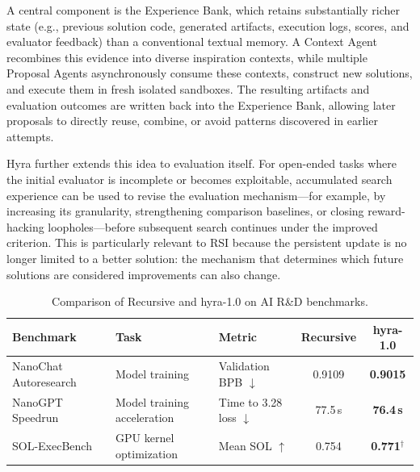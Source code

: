 A central component is the Experience Bank, which retains substantially richer state (e.g., previous solution code, generated artifacts, execution logs, scores, and evaluator feedback) than a conventional textual memory. A Context Agent recombines this evidence into diverse inspiration contexts, while multiple Proposal Agents asynchronously consume these contexts, construct new solutions, and execute them in fresh isolated sandboxes. The resulting artifacts and evaluation outcomes are written back into the Experience Bank, allowing later proposals to directly reuse, combine, or avoid patterns discovered in earlier attempts.

Hyra further extends this idea to evaluation itself. For open-ended tasks where the initial evaluator is incomplete or becomes exploitable, accumulated search experience can be used to revise the evaluation mechanism—for example, by increasing its granularity, strengthening comparison baselines, or closing reward-hacking loopholes—before subsequent search continues under the improved criterion. This is particularly relevant to RSI because the persistent update is no longer limited to a better solution: the mechanism that determines which future solutions are considered improvements can also change.


\begin{table}[t]
    \centering
    \caption{Comparison of Recursive and hyra-1.0 on AI R\&D benchmarks.}
    \label{tab:hyra_benchmarks}
    \small
    \setlength{\tabcolsep}{5pt}
    \renewcommand{\arraystretch}{1.1}
    \renewcommand{\tabularxcolumn}[1]{m{#1}}

    \begin{tabularx}{\linewidth}{
        @{}
        >{\centering\arraybackslash}X
        >{\centering\arraybackslash}X
        >{\centering\arraybackslash}X
        c
        c
        @{}
    }
        \toprule
        \textbf{Benchmark}
        & \textbf{Task}
        & \textbf{Metric}
        & \textbf{Recursive}
        & \textbf{hyra-1.0} \\
        \midrule

        NanoChat Autoresearch~\cite{nanogpt_ar}
        & Model training
        & Validation BPB $\downarrow$
        & 0.9109
        & \textbf{0.9015} \\

        \addlinespace
        NanoGPT Speedrun~\cite{modded_nanogpt_2024}
        & Model training acceleration
        & Time to 3.28 loss $\downarrow$
        & 77.5\,s
        & \textbf{76.4\,s} \\

        \addlinespace
        SOL-ExecBench~\cite{lin2026solexecbench}
        & GPU kernel optimization
        & Mean SOL $\uparrow$
        & 0.754
        & \textbf{0.771}$^{\dagger}$ \\

        \bottomrule
    \end{tabularx}
\end{table}

